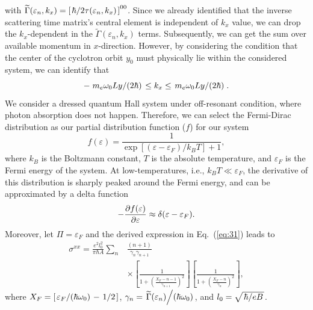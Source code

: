 \documentclass[
 reprint,
 amsmath,amssymb,
 aps,
 prb,
]{revtex4-2}
\begin{document}
with $\widetilde{{\Gamma}}(\varepsilon_n,k_x) = \left[\flatfrac{\hbar}{2\tau(\varepsilon_n,k_x)}\right]^{00}$. Since we already identified that the inverse scattering time matrix's central element is independent of $k_x$ value, we can drop the $k_x$-dependent in the $\widetilde{{\Gamma}}(\varepsilon_n,k_x)$ terms. Subsequently, we can get the sum over available momentum in $x$-direction.
However, by considering the condition that the center of the cyclotron orbit $y_0$ must physically lie within the considered system, we can identify that
\begin{equation} \label{eq:32}
 -\flatfrac{m_e\omega_0 Ly}{(2\hbar)} \leq k_x \leq \flatfrac{m_e\omega_0 Ly}{(2\hbar)}.
\end{equation}
{\color{Red}
We consider a dressed quantum Hall system under off-resonant condition, where photon absorption does not happen. Therefore, we can select the Fermi-Dirac distribution as our partial distribution function ($f$) for our system
\begin{equation} \label{eq:33}
  f(\varepsilon) = \frac{1}{\exp[(\varepsilon - \varepsilon_F)/k_B T]+1},
\end{equation}
where $k_B$ is the Boltzmann constant, $T$ is the absolute temperature, and $\varepsilon_F$ is the Fermi energy of the system. At low-temperatures, i.e., $k_BT \ll \varepsilon_F$, the derivative of this distribution is sharply peaked around the Fermi energy, and can be approximated by a delta function
\begin{equation} \label{eq:34}
  - \pdv{f(\varepsilon)}{\varepsilon} \approx \delta(\varepsilon - \varepsilon_F).
\end{equation}
Moreover, let $\Pi = \varepsilon_F$ and the derived expression in Eq.~(\ref{eq:31}) leads to
\begin{equation} \label{eq:35}
  \begin{aligned}
    \sigma^{xx}  =
    \frac{e^2l_0^2}{\pi\hbar A}
    \sum_{n} &
    \frac{(n+1)}{\gamma_{n}\gamma_{n+1}} \\
    &\times
    \left[
      \frac{1}
      {
        1 + \left(\frac{X_F - n -1}{\gamma_{n+1}}\right)^2
      }
    \right]
    \left[
      \frac{1}
      {
        1 + \left(\frac{X_F - n}{\gamma_{n}}\right)^2
      }
    \right],
  \end{aligned}
\end{equation}
where $X_F = \left[\flatfrac{\varepsilon_F}{(\hbar \omega_0)} - \flatfrac{1}{2}\right]$,
$\gamma_n = \flatfrac{\widetilde{{\Gamma}}(\varepsilon_n)}{(\hbar \omega_0)}$, and $l_0 = \sqrt{\flatfrac{\hbar}{eB}}$.
}
\end{document}
